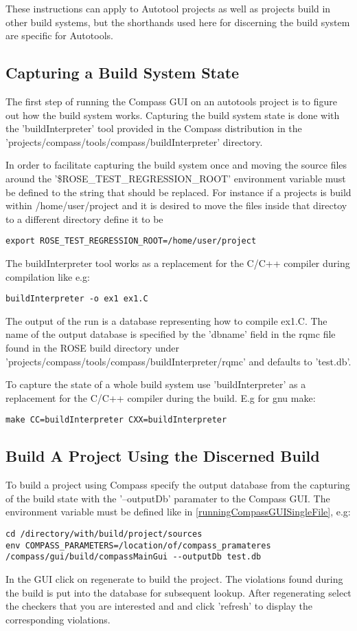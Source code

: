 These instructions can apply to Autotool projects as well as projects build in other build 
systems, but the shorthands used here for discerning the build system are specific for Autotools.


\subsection{Capturing a Build System State}

The first step of running the Compass GUI on an autotools project is to figure out how the build system
works. Capturing the build system state is done with the 'buildInterpreter' tool provided in the Compass
distribution in the 'projects/compass/tools/compass/buildInterpreter' directory. 

In order to facilitate capturing the build system once and moving the source files around the '\$ROSE\_TEST\_REGRESSION\_ROOT' environment variable must be defined to the string that should be replaced. For instance if a
projects is build within /home/user/project and it is desired to move the files inside that directoy to a
different directory define it to be
\begin{verbatim}
export ROSE_TEST_REGRESSION_ROOT=/home/user/project
\end{verbatim}

The buildInterpreter tool works as a replacement for the C/C++ compiler during compilation like e.g:
\begin{verbatim}
buildInterpreter -o ex1 ex1.C
\end{verbatim}
The output of the run is a database representing how to compile ex1.C. The name of the output database is specified
by the 'dbname' field in the rqmc file found in the ROSE build directory under 'projects/compass/tools/compass/buildInterpreter/rqmc' and defaults to 'test.db'.

To capture the state of a whole build system use 'buildInterpreter' as a replacement for the C/C++ compiler during
the build. E.g for gnu make:
\begin{verbatim}
make CC=buildInterpreter CXX=buildInterpreter
\end{verbatim}

\subsection{Build A Project Using the Discerned Build }

To build a project using Compass specify the output database from the capturing of the build state with the
'--outputDb' paramater to the Compass GUI. The environment variable must be defined like in \ref{runningCompassGUISingleFile}, e.g:
\begin{verbatim}
cd /directory/with/build/project/sources
env COMPASS_PARAMETERS=/location/of/compass_pramateres   /compass/gui/build/compassMainGui --outputDb test.db
\end{verbatim}
In the GUI click on regenerate to build the project. The violations found during the build is put into the database
for subsequent lookup. After regenerating select the checkers that you are interested and and click 'refresh' to display the corresponding violations.




